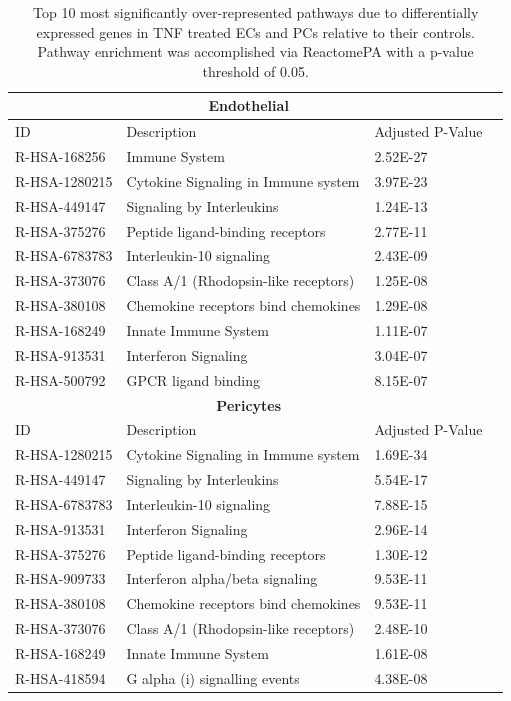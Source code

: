 
\begin{table}[h!t]
    \footnotesize
    \label{table:pathways}
	\centering
	\begin{tabular}{llll}
		\hline
		\multicolumn{3}{c}{\textbf{Endothelial}}\\\hline
		ID            & Description                          & Adjusted P-Value \\\hline
		R-HSA-168256  & Immune System                        & 2.52E-27 \\
		R-HSA-1280215 & Cytokine Signaling in Immune system  & 3.97E-23 \\
		R-HSA-449147  & Signaling by Interleukins            & 1.24E-13 \\
		R-HSA-375276  & Peptide ligand-binding receptors     & 2.77E-11 \\
		R-HSA-6783783 & Interleukin-10 signaling             & 2.43E-09 \\
		R-HSA-373076  & Class A/1 (Rhodopsin-like receptors) & 1.25E-08 \\
		R-HSA-380108  & Chemokine receptors bind chemokines  & 1.29E-08 \\
		R-HSA-168249  & Innate Immune System                 & 1.11E-07 \\
		R-HSA-913531  & Interferon Signaling                 & 3.04E-07 \\
		R-HSA-500792  & GPCR ligand binding                  & 8.15E-07 \\\hline
		\multicolumn{3}{c}{\textbf{Pericytes}} \\\hline
		ID            & Description                          & Adjusted P-Value \\\hline
		R-HSA-1280215 & Cytokine Signaling in Immune system  & 1.69E-34 \\
		R-HSA-449147  & Signaling by Interleukins            & 5.54E-17 \\
		R-HSA-6783783 & Interleukin-10 signaling             & 7.88E-15 \\
		R-HSA-913531  & Interferon Signaling                 & 2.96E-14 \\
		R-HSA-375276  & Peptide ligand-binding receptors     & 1.30E-12 \\
		R-HSA-909733  & Interferon alpha/beta signaling      & 9.53E-11 \\
		R-HSA-380108  & Chemokine receptors bind chemokines  & 9.53E-11 \\
		R-HSA-373076  & Class A/1 (Rhodopsin-like receptors) & 2.48E-10 \\
		R-HSA-168249  & Innate Immune System                 & 1.61E-08 \\
		R-HSA-418594  & G alpha (i) signalling events        & 4.38E-08 \\\hline
	\end{tabular}
    \caption{Top 10 most significantly over-represented pathways due to differentially expressed genes in TNF treated ECs and PCs relative to their controls. Pathway enrichment was accomplished via ReactomePA with a p-value threshold of 0.05.}
\end{table}

